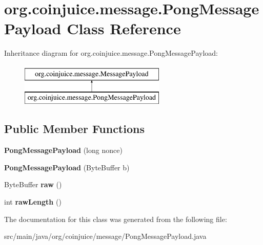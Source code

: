 \hypertarget{classorg_1_1coinjuice_1_1message_1_1_pong_message_payload}{\section{org.\-coinjuice.\-message.\-Pong\-Message\-Payload Class Reference}
\label{classorg_1_1coinjuice_1_1message_1_1_pong_message_payload}
}
Inheritance diagram for org.\-coinjuice.\-message.\-Pong\-Message\-Payload\-:\begin{figure}[H]
\begin{center}
\leavevmode
\includegraphics[height=2.000000cm]{classorg_1_1coinjuice_1_1message_1_1_pong_message_payload}
\end{center}
\end{figure}
\subsection*{Public Member Functions}
\begin{DoxyCompactItemize}
\item 
\hypertarget{classorg_1_1coinjuice_1_1message_1_1_pong_message_payload_abbbca3612b1d282614b4ed7c6835445c}{{\bfseries Pong\-Message\-Payload} (long nonce)}\label{classorg_1_1coinjuice_1_1message_1_1_pong_message_payload_abbbca3612b1d282614b4ed7c6835445c}

\item 
\hypertarget{classorg_1_1coinjuice_1_1message_1_1_pong_message_payload_a27f79dfbc6f8eb2e22595554fb597309}{{\bfseries Pong\-Message\-Payload} (Byte\-Buffer b)}\label{classorg_1_1coinjuice_1_1message_1_1_pong_message_payload_a27f79dfbc6f8eb2e22595554fb597309}

\item 
\hypertarget{classorg_1_1coinjuice_1_1message_1_1_pong_message_payload_a1398cbce304806b8c21ea46c541c3232}{Byte\-Buffer {\bfseries raw} ()}\label{classorg_1_1coinjuice_1_1message_1_1_pong_message_payload_a1398cbce304806b8c21ea46c541c3232}

\item 
\hypertarget{classorg_1_1coinjuice_1_1message_1_1_pong_message_payload_a5ee936066b2649058a6a6b2b34345e8a}{int {\bfseries raw\-Length} ()}\label{classorg_1_1coinjuice_1_1message_1_1_pong_message_payload_a5ee936066b2649058a6a6b2b34345e8a}

\end{DoxyCompactItemize}


The documentation for this class was generated from the following file\-:\begin{DoxyCompactItemize}
\item 
src/main/java/org/coinjuice/message/Pong\-Message\-Payload.\-java\end{DoxyCompactItemize}
